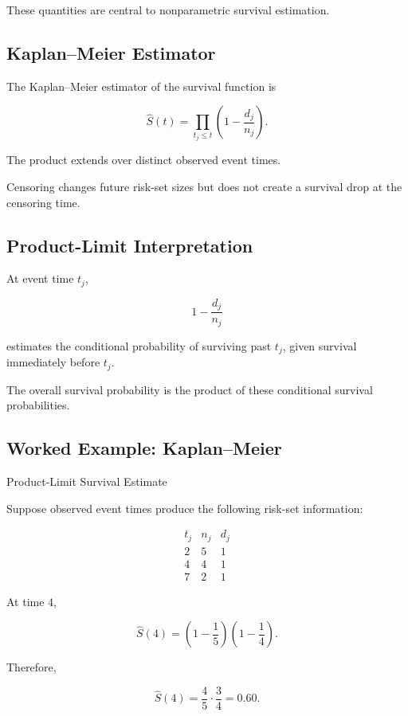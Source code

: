 These quantities are central to nonparametric survival estimation.

\subsection{Kaplan--Meier Estimator}
\label{subsec:kaplan-meier}

The Kaplan--Meier estimator of the survival function is

\[
\boxed{
\widehat{S}(t)
=
\prod_{t_j\leq t}
\left(
1-
\frac{
d_j
}{
n_j
}
\right).
}
\]

The product extends over distinct observed event times.

Censoring changes future risk-set sizes but does not create a survival
drop at the censoring time.

\subsection{Product-Limit Interpretation}
\label{subsec:product-limit}

At event time \(t_j\),

\[
\boxed{
1-
\frac{
d_j
}{
n_j
}
}
\]

estimates the conditional probability of surviving past \(t_j\), given
survival immediately before \(t_j\).

The overall survival probability is the product of these conditional
survival probabilities.

\subsection{Worked Example: Kaplan--Meier}
\label{subsec:worked-kaplan-meier}

\begin{workedexamplebox}{Product-Limit Survival Estimate}

Suppose observed event times produce the following risk-set information:

\[
\begin{array}{c|cc}
t_j & n_j & d_j\\
\hline
2 & 5 & 1\\
4 & 4 & 1\\
7 & 2 & 1
\end{array}
\]

At time \(4\),

\[
\widehat{S}(4)
=
\left(
1-\frac15
\right)
\left(
1-\frac14
\right).
\]

Therefore,

\begin{answerbox}
\[
\boxed{
\widehat{S}(4)
=
\frac45
\cdot
\frac34
=
0.60.
}
\]
\end{answerbox}

\end{workedexamplebox}

